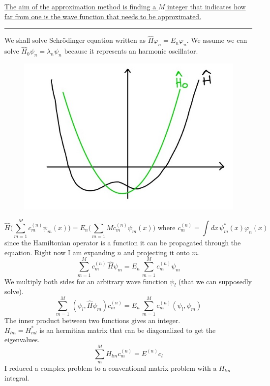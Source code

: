 \ul{The aim of the approximation method is finding a $M$ integer that indicates how far from one is the wave function that needs to be approximated.}\\
\newline
\noindent\rule{4cm}{0.1pt}
\newline
We shall solve Schr{\"o}dinger equation written as $\hat{H}\varphi_n=E_n\varphi_n$. We assume we can solve $\hat{H}_0\psi_n=\lambda_n\psi_n$ because it represents an harmonic oscillator.\\
\begin{figure}[htbp!]
\includegraphics[scale=0.20]{img_1.jpg}
\end{figure}
\[
\hat{H}\bigg(\sum_{m=1}^{M}c_m^{(n)}\psi_m(x)\bigg)=E_n\bigg(\sum_{m=1}{M}c_m^{(n)}\psi_m(x)\bigg)
\text{ where $c_m^{(n)}=\int dx\,\psi_m^*(x)\varphi_n(x)$}
\]
since the Hamiltonian operator is a function it can be propagated through the equation. Right now I am expanding $n$ and projecting it onto $m$.\\
\[
\sum_{m=1}^{M}c_m^{(n)}\,\hat{H}\psi_m=E_n\,\sum_{m=1}^{M}c_m^{(n)}\psi_m\]
We multiply both sides for an arbitrary wave function $\psi_l$ (that we can supposedly solve).
\[\sum_{m=1}^{M}\,(\psi_l,\hat{H}\psi_m)c_m^{(n)}=E_n\,\sum_{m=1}^{M}c_m^{(n)}(\psi_l,\psi_m)
\]
The inner product between two functions gives an integer. \\
$H_{lm}=H_{ml}^*$ is an hermitian matrix that can be diagonalized to get the eigenvalues.\\
\[
\sum_{m}^{M}H_{lm}c_m^{(n)}=E^{(n)}c_l
\]
I reduced a complex problem to a conventional matrix problem with a $H_{lm}$ integral.\\

